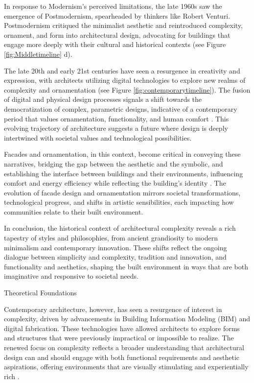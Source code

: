 In response to Modernism's perceived limitations, the late 1960s saw the emergence of Postmodernism, spearheaded by thinkers like Robert Venturi.
Postmodernism critiqued the minimalist aesthetic and reintroduced complexity, ornament, and form into architectural design, advocating for buildings that engage more deeply with their cultural and historical contexts \cite{Venturi1972} (see Figure \ref{fig:Middletimeline} d).

The late 20th and early 21st centuries have seen a resurgence in creativity and expression, with architects utilizing digital technologies to explore new realms of complexity and ornamentation \cite{Burlando2019} (see Figure \ref{fig:contemporarytimeline}).
The fusion of digital and physical design processes signals a shift towards the democratization of complex, parametric designs, indicative of a contemporary period that values ornamentation, functionality, and human comfort \cite{Schwab2016}.
This evolving trajectory of architecture suggests a future where design is deeply intertwined with societal values and technological possibilities.

Facades and ornamentation, in this context, become critical in conveying these narratives, bridging the gap between the aesthetic and the symbolic, and establishing the interface between buildings and their environments, influencing comfort and energy efficiency while reflecting the building's identity \cite{Kamal2020}.
The evolution of facade design and ornamentation mirrors societal transformations, technological progress, and shifts in artistic sensibilities, each impacting how communities relate to their built environment.

In conclusion, the historical context of architectural complexity reveals a rich tapestry of styles and philosophies, from ancient grandiosity to modern minimalism and contemporary innovation.
These shifts reflect the ongoing dialogue between simplicity and complexity, tradition and innovation, and functionality and aesthetics, shaping the built environment in ways that are both imaginative and responsive to societal needs.

Theoretical Foundations

Contemporary architecture, however, has seen a resurgence of interest in complexity, driven by advancements in Building Information Modeling (BIM) and digital fabrication. These technologies have allowed architects to explore forms and structures that were previously impractical or impossible to realize. The renewed focus on complexity reflects a broader understanding that architectural design can and should engage with both functional requirements and aesthetic aspirations, offering environments that are visually stimulating and experientially rich \cite{Gage2015}.

